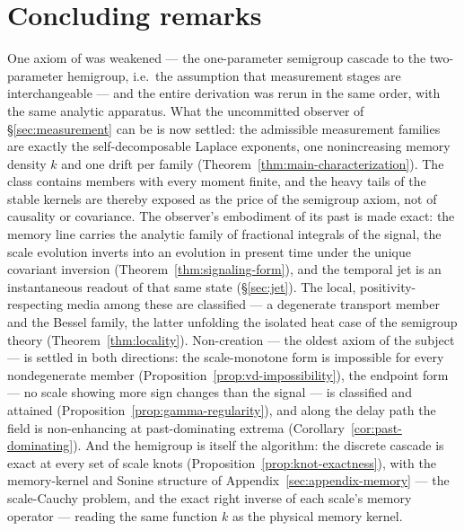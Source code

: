 
\section{Concluding remarks}\label{sec:conclusions}

One axiom of  was weakened --- the one-parameter semigroup
cascade to the two-parameter hemigroup, i.e.\ the assumption that measurement stages are
interchangeable --- and the entire derivation was rerun in the same order, with the same
analytic apparatus. What the uncommitted observer of \S\ref{sec:measurement} can be is now
settled: the admissible measurement families are exactly the self-decomposable Laplace
exponents, one nonincreasing memory density $k$ and one drift per family
(Theorem~\ref{thm:main-characterization}). The class contains members with every moment
finite, and the heavy tails of the stable kernels are thereby exposed as the price of the
semigroup axiom, not of causality or covariance. The observer's embodiment of its past is
made exact: the memory line carries the analytic family of fractional integrals of the
signal, the scale evolution inverts into an evolution in present time under the unique
covariant inversion (Theorem~\ref{thm:signaling-form}), and the temporal jet is an
instantaneous readout of that same state (\S\ref{sec:jet}). The local,
positivity-respecting media among these are classified --- a degenerate transport member
and the Bessel family, the latter unfolding the isolated heat case of the semigroup
theory (Theorem~\ref{thm:locality}). Non-creation ---
the oldest axiom of the subject --- is settled in both directions: the scale-monotone form
is impossible for every nondegenerate member (Proposition~\ref{prop:vd-impossibility}), the
endpoint form --- no scale showing more sign changes than the signal --- is classified and
attained (Proposition~\ref{prop:gamma-regularity}), and along the delay path the field is
non-enhancing at past-dominating extrema (Corollary~\ref{cor:past-dominating}). And the hemigroup
is itself the algorithm: the discrete cascade is exact at every set of scale knots
(Proposition~\ref{prop:knot-exactness}), with the memory-kernel and Sonine structure of
Appendix~\ref{sec:appendix-memory} --- the scale-Cauchy problem, and the exact right inverse of
each scale's memory operator --- reading the same function $k$ as the physical memory
kernel.

